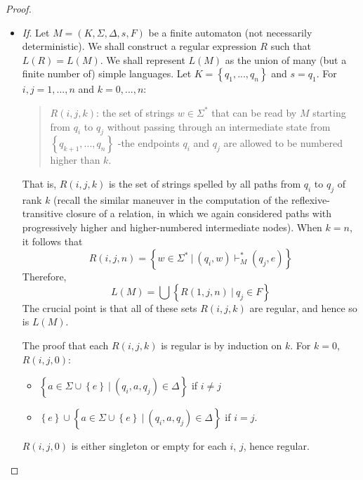 \begin{proof}
\begin{itemize}
    
    \item \textit{If}. Let $M = (K, \Sigma, \Delta, s, F)$ be a finite automaton (not necessarily deterministic). We shall construct a regular expression $R$ such that $L(R) = L(M)$. We shall represent $L(M)$ as the union of many (but a finite number of) simple languages. Let $K = \left\{ q_1, ..., q_n  \right\}$ and $s = q_1$. For $i, j = 1, ..., n$ and $k = 0, ..., n$:
    \begin{quote}
      $R(i, j, k)$: the set of strings $w \in \Sigma^*$ that can be read by $M$ starting from $q_i$ to $q_j$ without passing through an intermediate state from $\left\{ q_{k+1}, ..., q_n \right\}$ -the endpoints $q_i$ and $q_j$ are allowed to be numbered higher than $k$.
    \end{quote}
    That is, $R(i, j, k)$ is the set of strings spelled by all paths from $q_i$ to $q_j$ of rank $k$ (recall the similar maneuver in the computation of the reflexive-transitive closure of a relation, in which we again considered paths with progressively higher and higher-numbered intermediate nodes). When $k = n$, it follows that
    \begin{equation*}
      R(i,j,n) = \left\{ w \in \Sigma^*\ |\ (q_i, w) \vdash^*_M (q_j, e) \right\}
    \end{equation*}
    Therefore,
    \begin{equation*}
      L(M) = \bigcup \left\{ R(1, j, n)\ |\ q_j \in F \right\}
    \end{equation*}
    The crucial point is that all of these sets $R(i, j, k)$ are regular, and hence so is $L(M)$.

    \quad The proof that each $R(i, j, k)$ is regular is by induction on $k$. For $k = 0$, $R(i, j, 0)$:
    \begin{itemize}
      \item $\left\{ a \in \Sigma \cup \left\{ e \right\}\ |\ (q_i, a, q_j) \in \Delta \right\}$ if $i\neq j$
      \item $\left\{ e \right\} \cup \left\{ a \in \Sigma \cup \left\{ e \right\}\ |\ (q_i, a, q_j) \in \Delta \right\}$ if $i = j$.
    \end{itemize}
    $R(i, j, 0)$ is either singleton or empty for each $i$, $j$, hence regular.


\end{itemize}
\end{proof}
